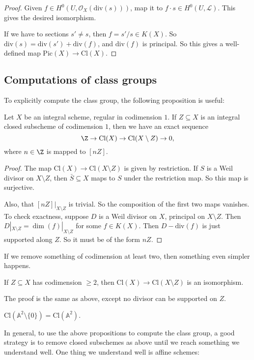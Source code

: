 \documentclass[a4paper]{article}
\newcommand\A{\mathbb{A}}
\renewcommand\div{\mathrm{div}}
\newcommand\Cl{\mathrm{Cl}}
\newcommand\Pic{\mathrm{Pic}}
\begin{document}
\begin{proof}
  Given $f \in H^0(U, \mathcal{O}_X(\div(s)))$, map it to $f \cdot s \in H^0(U, \mathcal{L})$. This gives the desired isomorphism.

  If we have to sections $s' \not= s$, then $f= s'/s \in K(X)$. So $\div(s) = \div (s') + \div(f)$, and $\div(f)$ is principal. So this gives a well-defined map $\Pic(X) \to \Cl(X)$.
\end{proof}

\subsection{Computations of class groups}
To explicitly compute the class group, the following proposition is useful:
\begin{prop}
  Let $X$ be an integral scheme, regular in codimension $1$. If $Z \subseteq X$ is an integral closed subscheme of codimension $1$, then we have an exact sequence
  \[
    \Z \to \Cl(X) \to \Cl(X \setminus Z) \to 0,
  \]
  where $n \in \Z$ is mapped to $[nZ]$.
\end{prop}

\begin{proof}
  The map $\Cl(X) \to \Cl(X \setminus Z)$ is given by restriction. If $S$ is a Weil divisor on $X \setminus Z$, then $\bar{S} \subseteq X$ maps to $S$ under the restriction map. So this map is surjective.

  Also, that $[nZ]|_{X \setminus Z}$ is trivial. So the composition of the first two maps vanishes. To check exactness, suppose $D$ is a Weil divisor on $X$, principal on $X \setminus Z$. Then $D|_{X \setminus Z} = \dim(f)|_{X \setminus Z}$ for some $f \in K(X)$. Then $D - \div(f)$ is just supported along $Z$. So it must be of the form $nZ$.
\end{proof}

If we remove something of codimension at least two, then something even simpler happens.
\begin{prop}
  If $Z \subseteq X$ has codimension $\geq 2$, then $\Cl(X) \to \Cl(X \setminus Z)$ is an isomorphism.
\end{prop}
The proof is the same as above, except no divisor can be supported on $Z$.

\begin{eg}
  $\Cl(\A^2 \setminus \{0\}) = \Cl(\A^2)$.
\end{eg}
In general, to use the above propositions to compute the class group, a good strategy is to remove closed subschemes as above until we reach something we understand well. One thing we understand well is affine schemes:
\end{document}
